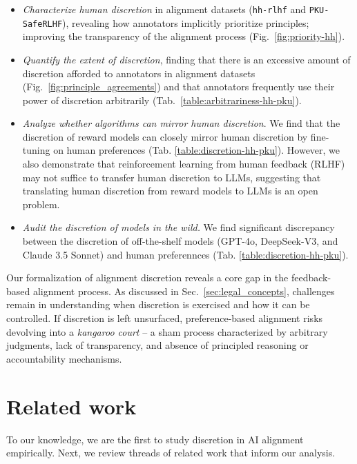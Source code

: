 \documentclass{article}
\begin{document}
\begin{itemize}[leftmargin=1cm]
\item \emph{Characterize human discretion} in alignment datasets (\texttt{hh-rlhf} and \texttt{PKU-SafeRLHF}), revealing how annotators implicitly prioritize principles; improving the transparency of the alignment process (Fig.~\ref{fig:priority-hh}).  

\item \emph{Quantify the extent of discretion},
finding that there is an excessive amount of discretion afforded to annotators in alignment datasets (Fig.~\ref{fig:principle_agreements}) and that annotators frequently use their power of discretion arbitrarily (Tab.~\ref{table:arbitrariness-hh-pku}). 

\item \emph{Analyze whether algorithms can mirror human discretion}. We find that the discretion of reward models can closely mirror human discretion by fine-tuning on human preferences (Tab. \ref{table:discretion-hh-pku}). However, we also demonstrate that reinforcement learning from human feedback (RLHF) may not suffice to transfer human discretion to LLMs, suggesting that translating human discretion from reward models to LLMs is an open problem.

\item \emph{Audit the discretion of models in the wild.} We find significant discrepancy between the discretion of off-the-shelf models (GPT-4o, DeepSeek-V3, and Claude 3.5 Sonnet) and human preferennces 
(Tab. \ref{table:discretion-hh-pku}).
\end{itemize}

Our formalization of alignment discretion reveals a core gap in the feedback-based alignment process. As discussed in Sec.~\ref{sec:legal_concepts}, challenges remain in understanding when discretion is exercised and how it can be controlled. If discretion is left unsurfaced, preference-based alignment risks devolving into a \emph{kangaroo court} \cite{mandersonKangarooCourtsRule2012} -- a sham process characterized by arbitrary judgments, lack of transparency, and absence of principled reasoning or accountability mechanisms.


\section{Related work}\label{sec:relatedwork}

To our knowledge, we are the first to study discretion in AI alignment empirically. Next, we review threads of related work that inform our analysis.
\end{document}

